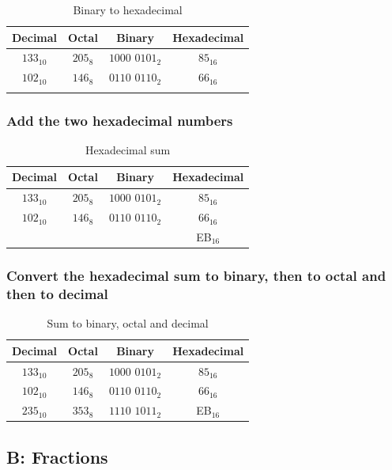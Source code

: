 \documentclass[12pt,a4paper]{article}
\begin{document}
\begin{table}[!h]
\centering
\caption{Binary to hexadecimal}
\begin{tabular}{c|c|c|c}
Decimal & Octal & Binary & Hexadecimal \\
\hline
$133_{10}$ & $205_{8}$ & $1000$ $0101_{2}$ & $85_{16}$ \\
\hline
$102_{10}$ & $146_{8}$ & $0110$ $0110_{2}$ &  $66_{16}$ \\
\hline
  &  &  &
\end{tabular}
\end{table}

\newpage
\subsubsection{Add the two hexadecimal numbers}

\begin{table}[!h]
\centering
\caption{Hexadecimal sum}
\begin{tabular}{c|c|c|c}
Decimal & Octal & Binary & Hexadecimal \\
\hline
$133_{10}$ & $205_{8}$ & $1000$ $0101_{2}$ & $85_{16}$ \\
\hline
$102_{10}$ & $146_{8}$ & $0110$ $0110_{2}$ &  $66_{16}$ \\
\hline
  &  &  & EB$_{16}$
\end{tabular}
\end{table}

\subsubsection{Convert the hexadecimal sum to binary, then to octal and then to decimal}

\begin{table}[!h]
\centering
\caption{Sum to binary, octal and decimal}
\begin{tabular}{c|c|c|c}
Decimal & Octal & Binary & Hexadecimal \\
\hline
$133_{10}$ & $205_{8}$ & $1000$ $0101_{2}$ & $85_{16}$ \\
\hline
$102_{10}$ & $146_{8}$ & $0110$ $0110_{2}$ &  $66_{16}$ \\
\hline
$235_{10}$ & $353_{8}$ & $1110$ $1011_{2}$ & EB$_{16}$
\end{tabular}
\end{table}

\subsection{B: Fractions}
\end{document}
